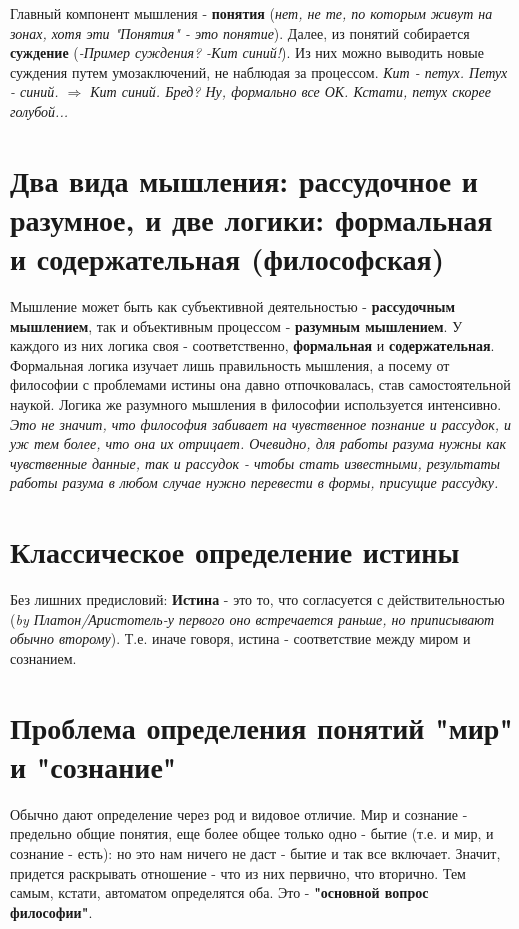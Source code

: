 \documentclass[12pt,a4paper]{article}
\begin{document}
Главный компонент мышления - \textbf{понятия} (\textit{нет, не те, по которым живут на зонах, хотя эти "Понятия" - это понятие}). Далее, из понятий собирается \textbf{суждение} (\textit{-Пример суждения? -Кит синий!}). Из них можно выводить новые суждения путем умозаключений, не наблюдая за процессом. \textit{Кит - петух. Петух - синий. $\Rightarrow$ Кит синий. Бред? Ну, формально все ОК. Кстати, петух скорее голубой...}


\section{Два вида мышления: рассудочное и разумное, и две логики: формальная и содержательная (философская)}
Мышление может быть как субъективной деятельностью - \textbf{рассудочным мышлением},
так и объективным процессом - \textbf{разумным мышлением}. 
У каждого из них логика своя - соответственно, \textbf{формальная} и \textbf{содержательная}.
Формальная логика изучает лишь правильность мышления, а посему от философии с проблемами истины она давно отпочковалась, став самостоятельной наукой. Логика же разумного мышления в философии используется интенсивно. 
\textit{ Это не значит, что философия забивает на чувственное познание и рассудок, и уж тем более, что она их отрицает. Очевидно, для работы разума нужны как чувственные данные, так и рассудок - чтобы стать известными, результаты работы разума в любом случае нужно перевести в формы, присущие рассудку.}

\section{Классическое определение истины}
Без лишних предисловий: \textbf{Истина} - это то, что согласуется с действительностью (\textit{by Платон/Аристотель-у первого оно встречается раньше, но приписывают обычно второму}). 
Т.е. иначе говоря, истина - соответствие между миром и сознанием.

\section{Проблема определения понятий "мир" и "сознание"}
Обычно дают определение через род и видовое отличие. Мир и сознание - предельно общие понятия, еще более общее только одно - бытие (т.е. и мир, и сознание - есть): но это нам ничего не даст - бытие и так все включает. Значит, придется раскрывать отношение - что из них первично, что вторично. Тем самым, кстати, автоматом определятся оба. Это - \textbf{"основной вопрос философии"}. 
\end{document}
